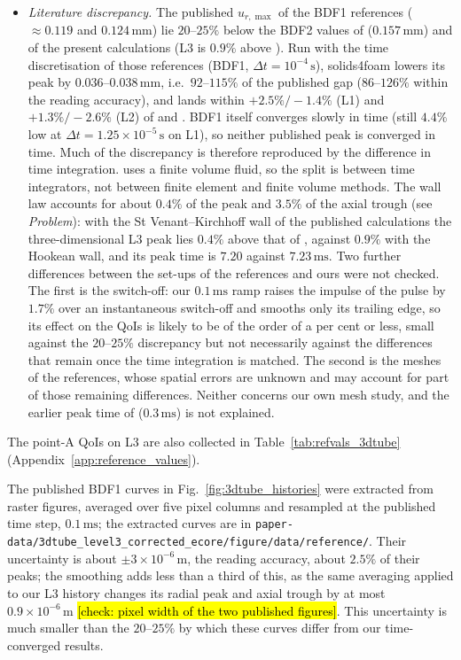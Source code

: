 \begin{itemize}
	\item \emph{Literature discrepancy.} The published $u_{r,\max}$ of the BDF1 references ($\approx0.119$ and $0.124\,\mathrm{mm}$) lie $20$--$25\%$ below the BDF2 values of \citet{Tukovic2018} ($0.157\,\mathrm{mm}$) and of the present calculations (L3 is $0.9\%$ above \citet{Tukovic2018}). Run with the time discretisation of those references (BDF1, $\Delta t = 10^{-4}\,\mathrm{s}$), solids4foam lowers its peak by $0.036$--$0.038\,\mathrm{mm}$, i.e.\ $92$--$115\%$ of the published gap ($86$--$126\%$ within the reading accuracy), and lands within $+2.5\%/-1.4\%$ (L1) and $+1.3\%/-2.6\%$ (L2) of \citet{Lozovskiy2019} and \citet{Eken2016}. BDF1 itself converges slowly in time (still $4.4\%$ low at $\Delta t = 1.25\times10^{-5}\,\mathrm{s}$ on L1), so neither published peak is converged in time. Much of the discrepancy is therefore reproduced by the difference in time integration. \citet{Eken2016} uses a finite volume fluid, so the split is between time integrators, not between finite element and finite volume methods. The wall law accounts for about $0.4\%$ of the peak and $3.5\%$ of the axial trough (see \emph{Problem}): with the St Venant--Kirchhoff wall of the published calculations the three-dimensional L3 peak lies $0.4\%$ above that of \citet{Tukovic2018}, against $0.9\%$ with the Hookean wall, and its peak time is $7.20$ against $7.23\,\mathrm{ms}$. Two further differences between the set-ups of the references and ours were not checked. The first is the switch-off: our $0.1\,\mathrm{ms}$ ramp raises the impulse of the pulse by $1.7\%$ over an instantaneous switch-off and smooths only its trailing edge, so its effect on the QoIs is likely to be of the order of a per cent or less, small against the $20$--$25\%$ discrepancy but not necessarily against the differences that remain once the time integration is matched. The second is the meshes of the references, whose spatial errors are unknown and may account for part of those remaining differences. Neither concerns our own mesh study, and the earlier peak time of \citet{Eken2016} ($0.3\,\mathrm{ms}$) is not explained.
\end{itemize}
The point-A QoIs on L3 are also collected in Table~\ref{tab:refvals_3dtube} (Appendix~\ref{app:reference_values}).

The published BDF1 curves in Fig.~\ref{fig:3dtube_histories} were extracted from raster figures, averaged over five pixel columns and resampled at the published time step, $0.1\,\mathrm{ms}$; the extracted curves are in \texttt{paper-data/3dtube\_level3\_corrected\_ecore/figure/data/reference/}.
Their uncertainty is about $\pm3\times10^{-6}\,\mathrm{m}$, the reading accuracy, about $2.5\%$ of their peaks; the smoothing adds less than a third of this, as the same averaging applied to our L3 history changes its radial peak and axial trough by at most $0.9\times10^{-6}\,\mathrm{m}$ \hl{[check: pixel width of the two published figures]}.
This uncertainty is much smaller than the $20$--$25\%$ by which these curves differ from our time-converged results.

